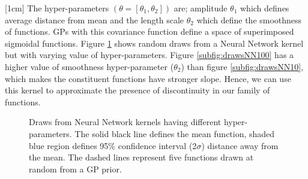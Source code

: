 [1cm]
The hyper-parameters $(\theta = [\theta_{1}, \theta_{2}])$ are; amplitude $\theta_{1}$ which defines average distance from mean and the length scale $\theta_{2}$ which define the smoothness of functions. GPs with this covariance function define a space of superimposed sigmoidal functions. Figure \ref{figNNPrior} shows random draws from a Neural Network kernel but with varying value of hyper-parameters. Figure \ref{subfig:drawsNN100} has a higher value of smoothness hyper-parameter ($\theta_{2}$) than figure \ref{subfig:drawsNN10}, which makes the constituent functions have stronger slope. Hence, we can use this kernel to approximate the presence of discontinuity in our family of functions. 

\begin{figure}[!ht]
  \centering
  \quad
    \quad
  \caption{Draws from Neural Network kernels having different hyper-parameters. The solid black line defines the mean function, shaded blue region defines 95\% confidence interval (2$\sigma$) distance away from the mean. The dashed lines represent five functions drawn at random from a GP prior.}
  \label{figNNPrior}
\end{figure}

